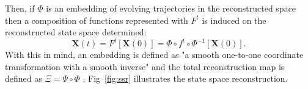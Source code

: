 \documentclass[fleqn,10pt]{wlscirep}
\begin{document}
Then, if $\Phi$ is an embedding of evolving trajectories in the reconstructed 
space then a composition of functions represented with $F^t$ is induced on the
reconstructed state space determined:
\begin{equation}\label{eq:st}
  \boldsymbol{X}(t)=F^t [\boldsymbol{X}(0)] = \Phi \circ f^t \circ \Phi ^{-1}[\boldsymbol{X}(0)].
\end{equation}
With this in mind, an embedding is defined as "a smooth one-to-one 
coordinate transformation with a smooth inverse" and the total reconstruction 
map is defined as $ \Xi = \Psi \circ \Phi $ \cite{casdagli1991}.
Fig~\ref{fig:ssr} illustrates the state space reconstruction.
\end{document}
